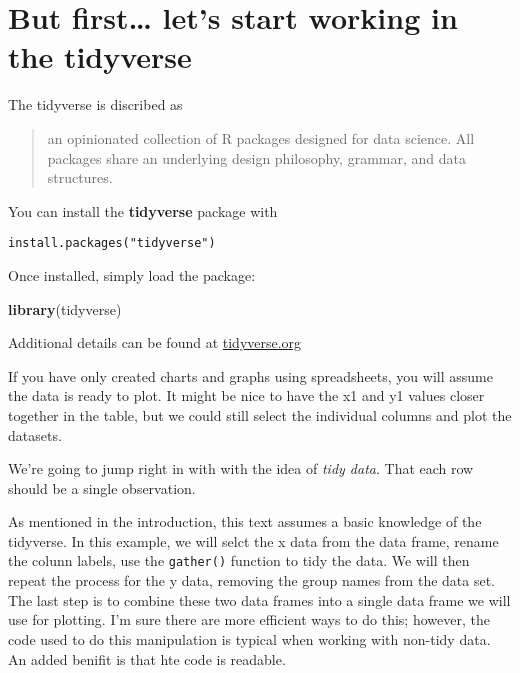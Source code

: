 \documentclass[]{book}
\newenvironment{Shaded}{\begin{snugshade}}{\end{snugshade}}
\newcommand{\KeywordTok}[1]{\textcolor[rgb]{0.13,0.29,0.53}{\textbf{#1}}}
\newcommand{\NormalTok}[1]{#1}
\theoremstyle{definition}
\theoremstyle{definition}
\theoremstyle{definition}
\theoremstyle{remark}
\begin{document}
\hypertarget{but-first-lets-start-working-in-the-tidyverse}{%
\section{But first\ldots{} let's start working in the
tidyverse}\label{but-first-lets-start-working-in-the-tidyverse}}

The tidyverse is discribed as

\begin{quote}
an opinionated collection of R packages designed for data science. All
packages share an underlying design philosophy, grammar, and data
structures.
\end{quote}

You can install the \textbf{tidyverse} package with

\begin{verbatim}
install.packages("tidyverse")
\end{verbatim}

Once installed, simply load the package:

\begin{Shaded}
\begin{Highlighting}[]
\KeywordTok{library}\NormalTok{(tidyverse)}
\end{Highlighting}
\end{Shaded}

Additional details can be found at
\href{https://www.tidyverse.org}{tidyverse.org}

If you have only created charts and graphs using spreadsheets, you will
assume the data is ready to plot. It might be nice to have the x1 and y1
values closer together in the table, but we could still select the
individual columns and plot the datasets.

We're going to jump right in with with the idea of \emph{tidy data}.
That each row should be a single observation.

As mentioned in the introduction, this text assumes a basic knowledge of
the tidyverse. In this example, we will selct the x data from the data
frame, rename the colunn labels, use the \texttt{gather()} function to
tidy the data. We will then repeat the process for the y data, removing
the group names from the data set. The last step is to combine these two
data frames into a single data frame we will use for plotting. I'm sure
there are more efficient ways to do this; however, the code used to do
this manipulation is typical when working with non-tidy data. An added
benifit is that hte code is readable.
\end{document}
